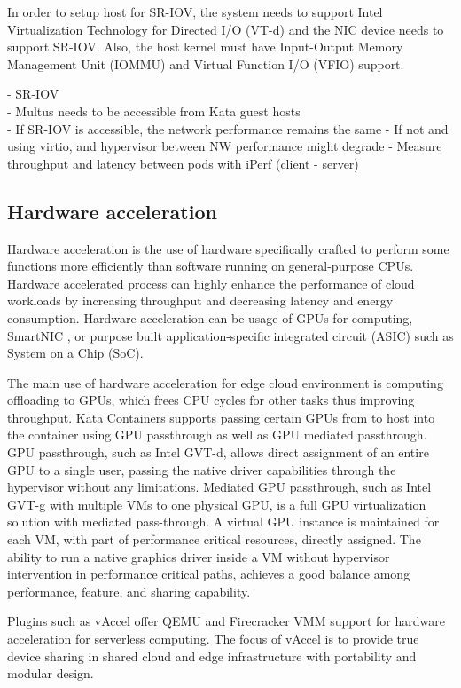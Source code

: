 In order to setup host for SR-IOV, the system needs to support Intel Virtualization Technology for Directed I/O (VT-d) and the NIC device needs to support SR-IOV. Also, the host kernel must have Input-Output Memory Management Unit (IOMMU) and Virtual Function I/O (VFIO) support.

- SR-IOV \\
	- Multus needs to be accessible from Kata guest hosts \\
	
- If SR-IOV is accessible, the network performance remains the same
	- If not and using virtio, and hypervisor between NW performance might degrade
		- Measure throughput and latency between pods with iPerf (client - server)

\subsection{Hardware acceleration}

Hardware acceleration is the use of hardware specifically crafted to perform some functions more efficiently than software running on general-purpose CPUs. Hardware accelerated process can highly enhance the performance of cloud workloads by increasing throughput and decreasing latency and energy consumption. Hardware acceleration can be usage of GPUs for computing, SmartNIC \cite{SmartNICIntel}, or purpose built application-specific integrated circuit (ASIC) such as System on a Chip (SoC).

The main use of hardware acceleration for edge cloud environment is computing offloading to GPUs, which frees CPU cycles for other tasks thus improving throughput. Kata Containers supports passing certain GPUs from to host into the container using GPU passthrough as well as GPU mediated passthrough. GPU passthrough, such as Intel GVT-d, allows direct assignment of an entire GPU to a single user, passing the native driver capabilities through the hypervisor without any limitations. Mediated GPU passthrough, such as Intel GVT-g with multiple VMs to one physical GPU, is a full GPU virtualization solution with mediated pass-through. A virtual GPU instance is maintained for each VM, with part of performance critical resources, directly assigned. The ability to run a native graphics driver inside a VM without hypervisor intervention in performance critical paths, achieves a good balance among performance, feature, and sharing capability. \cite{GPUKataContainers}

Plugins such as vAccel \cite{vAccel} offer QEMU and Firecracker VMM support for hardware acceleration for serverless computing. The focus of vAccel is to provide true device sharing in shared cloud and edge infrastructure with portability and modular design.
		
